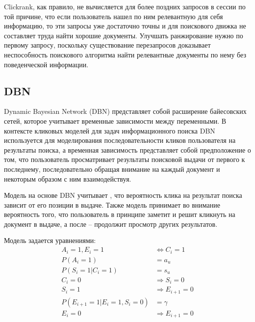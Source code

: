 \documentclass[diploma]{nanolab2015}
\begin{document}
Clickrank, как правило, не вычисляется для более поздних запросов в сессии по той причине, что если пользователь нашел по ним релевантную для себя информацию, то эти запросы уже достаточно точны и для поискового движка не составляет труда найти хорошие документы. Улучшать ранжирование нужно по первому запросу, поскольку существование перезапросов доказывает неспособность поискового алгоритма найти релевантные документы по нему без поведенческой информации.

\subsection{DBN}
Dynamic Bayesian Network (DBN) представляет собой расширение байесовских сетей, которое учитывает временные зависимости между переменными. В контексте кликовых моделей для задач информационного поиска DBN используется для моделирования последовательности кликов пользователя на результаты поиска, а временная зависимость представляет собой предположение о том, что пользователь просматривает результаты поисковой выдачи от первого к последнему, последовательно обращая внимание на каждый документ и некоторым образом с ним взаимодействуя.

Модель на основе DBN учитывает \cite{DBN}, что вероятность клика на результат поиска зависит от его позиции в выдаче. Также модель принимает во внимание вероятность того, что пользователь в принципе заметит и решит кликнуть на документ в выдаче, а после -- продолжит просмотр других результатов.

Модель задается уравнениями:
\begin{align}
    A_i = 1, E_i = 1                  & \Leftrightarrow C_i = 1 \label{dbn:1} \\
    P(A_i = 1)                        & = a_u                  \label{dbn:2}  \\
    P(S_i = 1| C_i = 1)               & = s_u                   \label{dbn:3} \\
    C_i = 0                           & \Rightarrow S_i = 0 \label{dbn:4}     \\
    S_i = 1                           & \Rightarrow E_{i+1} = 0 \label{dbn:5} \\
    P(E_{i+1} = 1 | E_i = 1, S_i = 0) & = \gamma                \label{dbn:6} \\
    E_i = 0                           & \Rightarrow E_{i+1} = 0 \label{dbn:7}
\end{align}
\end{document}
